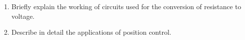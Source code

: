 \begin{procedure}
\end{procedure}

\begin{reportq}
  \begin{enumerate}
    \item Briefly explain the working of circuits used for the conversion of resistance to voltage.
    \item Describe in detail the applications of position control.
  \end{enumerate}
\end{reportq}
